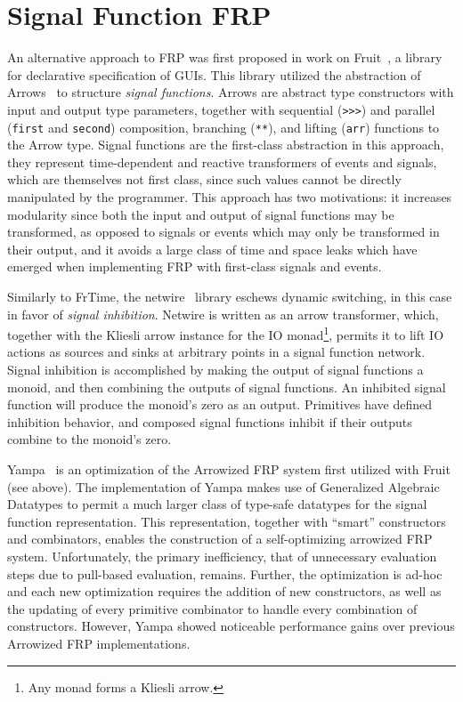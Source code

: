 \section{Signal Function FRP}
\label{section:Background-signal_function_frp}

An alternative approach to FRP was first proposed in work on
Fruit~\cite{Courtney2001-1}, a library for declarative specification of GUIs.
This library utilized the abstraction of Arrows~\cite{Hughes2000} to structure
{\em signal functions}. Arrows are abstract type constructors with input and
output type parameters, together with sequential ({\tt >>>}) and parallel
({\tt first} and {\tt second}) composition, branching ({\tt ***}), and lifting
({\tt arr}) functions to the Arrow type. Signal functions are the first-class
abstraction in this approach, they represent time-dependent and reactive
transformers of events and signals,  which are themselves not first class,
since such values cannot be directly manipulated by the programmer. This
approach has two motivations: it increases modularity since both the input and
output of signal functions may be transformed, as opposed to signals or events
which may only be transformed in their output, and it avoids a large class of
time and space leaks which have emerged when implementing FRP with first-class
signals and events.

Similarly to FrTime, the netwire~\cite{Soylemez} library eschews dynamic
switching, in this case in favor of {\em signal inhibition}. Netwire is written
as an arrow transformer, which, together with the Kliesli arrow instance for the
IO monad\footnote{Any monad forms a Kliesli arrow.}, permits it to lift IO
actions as sources and sinks at arbitrary points in a signal function network.
Signal inhibition is accomplished by making the output of signal functions a
monoid, and then combining the outputs of signal functions. An inhibited signal
function will produce the monoid's zero as an output. Primitives have defined
inhibition behavior, and composed signal functions inhibit if their outputs
combine to the monoid's zero.

Yampa~\cite{Nilsson2005} is an optimization of the Arrowized FRP system first
utilized with Fruit (see above). The implementation of Yampa makes use of
Generalized Algebraic Datatypes to permit a much larger class of type-safe
datatypes for the signal function representation. This representation,
together with ``smart'' constructors and combinators, enables the construction
of a self-optimizing arrowized FRP system. Unfortunately, the primary
inefficiency, that of unnecessary evaluation steps due to pull-based evaluation,
remains. Further, the optimization is ad-hoc and each new optimization requires
the addition of new constructors, as well as the updating of every primitive
combinator to handle every combination of constructors. However, Yampa showed
noticeable performance gains over previous Arrowized FRP implementations.

